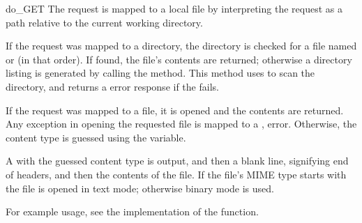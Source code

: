 \begin{methoddesc}{do_GET}{}
The request is mapped to a local file by interpreting the request as
a path relative to the current working directory.

If the request was mapped to a directory, the directory is checked for
a file named  or  (in that order).
If found, the file's contents are returned; otherwise a directory
listing is generated by calling the  method.
This method uses  to scan the directory, and
returns a  error response if the  fails.

If the request was mapped to a file, it is opened and the contents are
returned.  Any  exception in opening the requested
file is mapped to a , 
error. Otherwise, the content type is guessed using the
 variable.

A  with the guessed content type is output, and
then a blank line, signifying end of headers, and then the contents of
the file. If the file's MIME type starts with  the file is
opened in text mode; otherwise binary mode is used.

For example usage, see the implementation of the 
function.
\end{methoddesc}


\begin{seealso}
\end{seealso}
